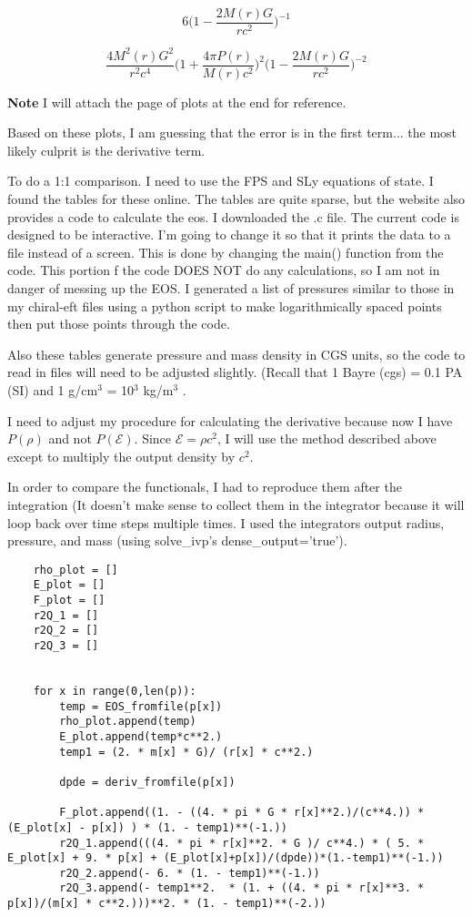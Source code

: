 \documentclass[11pt]{article}
\numberwithin{equation}{section}
\begin{document}
\begin{equation}
6 \bigg( 1- \frac{2 M(r) G}{r c^{2}}  \bigg)^{-1}
\end{equation}

\begin{equation}
\frac{4 M^{2}(r) G^{2}}{r^{2}c^{4}} \bigg( 1 + \frac{4 \pi P(r)}{M(r) c^{2}}  \bigg)^{2} \bigg( 1 - \frac{2 M(r) G}{r c^{2}} \bigg)^{-2}
\end{equation}

\textbf{Note} I will attach the page of plots at the end for reference.  

Based on these plots, I am guessing that the error is in the first term... the most likely culprit is the derivative term.

To do a 1:1 comparison. I need to use the FPS and SLy equations of state.  I found the tables for these online.  The tables are quite sparse, but the website also provides a code to calculate the eos.  I downloaded the .c file.  The current code is designed to be interactive.  I'm going to change it so that it prints the data to a file instead of a screen.  This is done by changing the main() function from the code.  This portion f the code DOES NOT do any calculations, so I am not in danger of messing up the EOS.  I generated a list of pressures similar to those in my chiral-eft files using a python script to make logarithmically spaced points then put those points through the code.  

Also these tables generate pressure and mass density in CGS units, so the code to read in files will need to be adjusted slightly.  (Recall that 1 Bayre (cgs) = 0.1 PA (SI) and 1 g/cm$^3$ = 10$^3$ kg/m$^3$ .  

I need to adjust my procedure for calculating the derivative because now I have $P(\rho)$ and not $P(\mathcal{E})$.  Since $\mathcal{E} = \rho c^{2}$, I will use the method described above except to multiply the output density by $c^2$. 

In order to compare the functionals, I had to reproduce them after the integration (It doesn't make sense to collect them in the integrator because it will loop back over time steps multiple times.   I used the integrators output radius, pressure, and mass (using solve\_ivp's dense\_output='true').

\begin{lstlisting}
    rho_plot = []
    E_plot = []
    F_plot = []
    r2Q_1 = []
    r2Q_2 = []
    r2Q_3 = []


    for x in range(0,len(p)):
        temp = EOS_fromfile(p[x])
        rho_plot.append(temp)
        E_plot.append(temp*c**2.)
        temp1 = (2. * m[x] * G)/ (r[x] * c**2.)

        dpde = deriv_fromfile(p[x])

        F_plot.append((1. - ((4. * pi * G * r[x]**2.)/(c**4.)) * (E_plot[x] - p[x]) ) * (1. - temp1)**(-1.))
        r2Q_1.append(((4. * pi * r[x]**2. * G )/ c**4.) * ( 5. * E_plot[x] + 9. * p[x] + (E_plot[x]+p[x])/(dpde))*(1.-temp1)**(-1.)) 
        r2Q_2.append(- 6. * (1. - temp1)**(-1.))
        r2Q_3.append(- temp1**2.  * (1. + ((4. * pi * r[x]**3. * p[x])/(m[x] * c**2.)))**2. * (1. - temp1)**(-2.))
\end{lstlisting}
\end{document}
